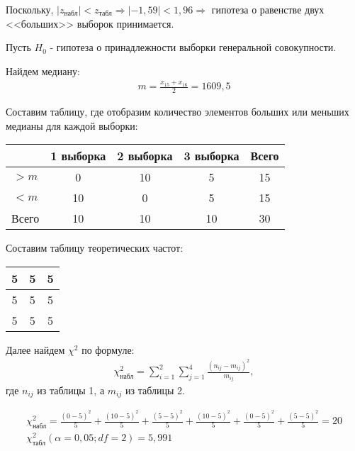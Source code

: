 \documentclass[utf8, a4paper, 14pt, russian, oneside]{book}
\begin{document}
Поскольку, $|z_{\text{набл}}| < z_{\text{табл}} \Rightarrow |-1,59| < 1,96 \Rightarrow$ гипотеза о равенстве двух <<больших>> выборок принимается.
\newpage


Пусть $H_0$ - гипотеза о принадлежности выборки генеральной совокупности.

Найдем медиану:
\begin{align*}
    m = \frac{x_{15} + x_{16}}{2} = 1609,5
\end{align*}

Составим таблицу, где отобразим количество элементов больших или меньших медианы для каждой выборки:
\begin{table}[h!]
    \centering
    \begin{tabular}{|c|c|c|c|c|}
        \hline
        & 1 выборка & 2 выборка & 3 выборка & Всего \\ \hline
        $ > m$ & 0 & 10 & 5 & 15 \\ \hline
        $ < m$ & 10 & 0 & 5 & 15 \\ \hline
        Всего & 10 & 10 & 10 & 30 \\ \hline
    \end{tabular}
\end{table}

Составим таблицу теоретических частот:
\begin{table}[h!]
    \centering 
    \begin{tabular}{|c|c|c|}
        \hline 
        5 & 5 & 5 \\ \hline
        5 & 5 & 5 \\ \hline
        5 & 5 & 5 \\ \hline
    \end{tabular}
\end{table}

Далее найдем $\chi^2$ по формуле:
\begin{align*}
    \chi^2_{\text{набл}} = \sum^2_{i=1}\sum^4_{j=1}\frac{(n_{ij} - m_{ij})^2}{m_{ij}},
\end{align*}
где $n_{ij}$ из таблицы 1, а $m_{ij}$ из таблицы 2.

\begin{gather*}
    \chi^2_{\text{набл}} = 
    \frac{(0 - 5)^2}{5} +
    \frac{(10 - 5)^2}{5} +
    \frac{(5 - 5)^2}{5} +
    \frac{(10 - 5)^2}{5} +
    \frac{(0 - 5)^2}{5} +
    \frac{(5 - 5)^2}{5} = 20 \\
    \chi^2_{\text{табл}}(\alpha = 0,05; df=2) = 5,991
\end{gather*}
\end{document}
